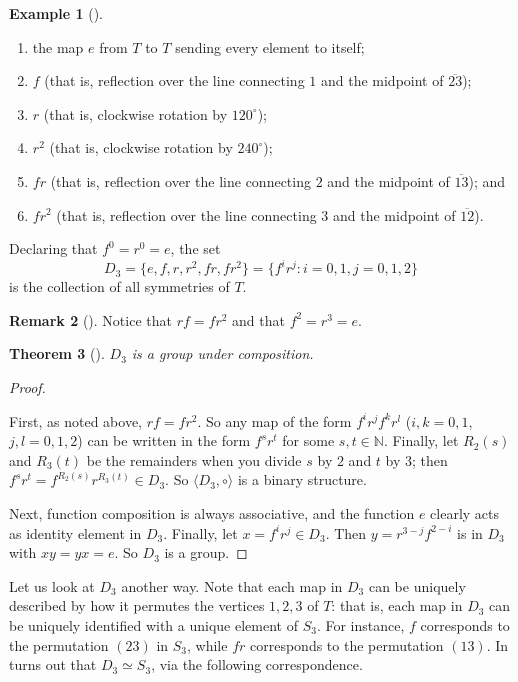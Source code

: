 \documentclass[10pt,]{book}
\theoremstyle{plain}
\newtheorem{theorem}{Theorem}[section]
\theoremstyle{definition}
\theoremstyle{definition}
\newtheorem{remark}[theorem]{Remark}
\theoremstyle{definition}
\newtheorem{example}[theorem]{Example}
\theoremstyle{definition}
\numberwithin{equation}{section}
\def\N{\mathbb{N}}
\begin{document}
\begin{example}[]
\begin{enumerate}
\item\hypertarget{li-344}{}the map \(e\) from \(T\) to \(T\) sending every element to itself;%
\item\hypertarget{li-345}{}\(f\) (that is, reflection over the line connecting \(1\) and the midpoint of \(\overline{23}\));%
\item\hypertarget{li-346}{}\(r\) (that is, clockwise rotation by \(120^{\circ}\));%
\item\hypertarget{li-347}{}\(r^2\) (that is, clockwise rotation by \(240^{\circ}\));%
\item\hypertarget{li-348}{}\(fr\) (that is, reflection over the line connecting \(2\) and the midpoint of \(\overline{13}\)); and%
\item\hypertarget{li-349}{}\(fr^2\) (that is, reflection over the line connecting \(3\) and the midpoint of \(\overline{12}\)).%
\end{enumerate}
%
\par
Declaring that \(f^0=r^0=e\), the set%
\begin{equation*}
D_3=\{e, f, r, r^2, fr, fr^2\}=\{f^ir^j:i=0,1, j=0,1,2\}
\end{equation*}
is the collection of all symmetries of \(T\).%
\end{example}
\begin{remark}[]\label{remark-32}
Notice that \(rf=fr^2\) and that \(f^2=r^3=e\).%
\end{remark}
\begin{theorem}[{}]\label{di3}
\(D_3\) is a group under composition.%
\end{theorem}
\begin{proof}\hypertarget{proof-35}{}
First, as noted above, \(rf=fr^2\). So any map of the form \(f^ir^jf^kr^l\) (\(i,k=0,1\), \(j,l=0,1,2\)) can be written in the form \(f^sr^t\) for some \(s,t \in \N\). Finally, let \(R_2(s)\) and \(R_3(t)\) be the remainders when you divide \(s\) by \(2\) and \(t\) by \(3\); then \(f^sr^t=f^{R_2(s)}r^{R_3(t)} \in D_3\). So \(\langle D_3,\circ\rangle \) is a binary structure.%
\par
Next, function composition is always associative, and the function \(e\) clearly acts as identity element in \(D_3\). Finally, let \(x=f^ir^j\in D_3\). Then \(y=r^{3-j}f^{2-i}\) is in \(D_3\) with \(xy=yx=e\). So \(D_3\) is a group.%
\end{proof}
\label{notation-61}
 Let us look at \(D_3\) another way. Note that each map in \(D_3\) can be uniquely described by how it permutes the vertices \(1,2,3\) of \(T\): that is, each map in \(D_3\) can be uniquely identified with a unique element of \(S_3\). For instance, \(f\) corresponds to the permutation \((23)\) in \(S_3\), while \(fr\) corresponds to the permutation \((13)\). In turns out that \(D_3 \simeq S_3\), via the following correspondence.%
\end{document}
